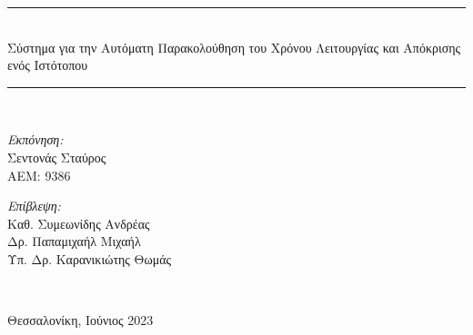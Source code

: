\begin{titlepage}
\begin{center}
    \rule{450pt}{4pt} \\[0.4cm]
    {\fontsize{20.26pt}{1em}\selectfont Σύστημα για την Αυτόματη Παρακολούθηση του Χρόνου Λειτουργίας και Απόκρισης ενός Ιστότοπου}

    \rule{350pt}{4pt} \\[4cm]

    \begin{minipage}{0.4\textwidth}
      \begin{flushleft} \normalsize
        \emph{Εκπόνηση:} \\
        Σεντονάς Σταύρος \\
        ΑΕΜ: 9386
      \end{flushleft}
    \end{minipage}
    \begin{minipage}{0.4\textwidth}
      \begin{flushright} \normalsize
        \emph{Επίβλεψη:} \\
        Καθ. Συμεωνίδης Ανδρέας\\
        Δρ. Παπαμιχαήλ Μιχαήλ \\
        Υπ. Δρ. Καρανικιώτης Θωμάς \\
      \end{flushright}
    \end{minipage}
    \\[1cm]
    \vfill

    \large Θεσσαλονίκη, Ιούνιος 2023

  \end{center}
\end{titlepage}

